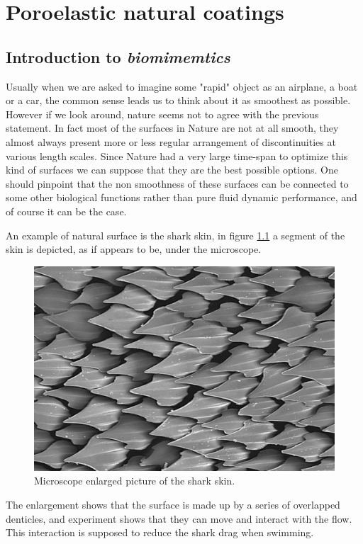 \chapter{Poroelastic natural coatings}



\section{Introduction to \textit{biomimemtics}}

Usually when we are asked to imagine some "rapid" object as an airplane, a boat or a car, the common sense leads us to think about it as smoothest as possible.
However if we look around, nature seems not to agree with the previous statement.
In fact most of the surfaces in Nature are not at all smooth, they almost always present more or less regular arrangement of discontinuities at various length scales.
Since Nature had a very large time-span to optimize this kind of surfaces we can suppose that they are the best possible options.
One should pinpoint that the non smoothness of these surfaces can be connected to some other biological functions rather than pure fluid dynamic performance, and of course it can be the case.

An example of natural surface is the shark skin, in figure \ref{fig:shark} a segment of the skin is depicted, as if appears to be, under the microscope.

\begin{figure}[h]
	\centering
	\includegraphics[width=0.6\linewidth]{chapter_1/shark}
	\caption{Microscope enlarged picture of the shark skin.}
	\label{fig:shark}
\end{figure}

The enlargement shows that the surface is made up by a series of overlapped denticles, and experiment shows that they can move and interact with the flow. This interaction is supposed to reduce the shark drag when swimming.

